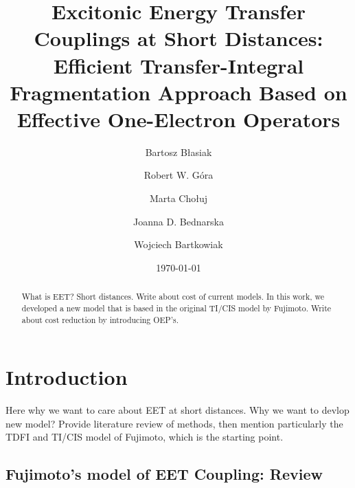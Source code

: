 


\title{Excitonic Energy Transfer Couplings at Short Distances: Efficient Transfer-Integral Fragmentation Approach
Based on Effective One-Electron Operators}

\author{Bartosz B{\l}asiak}
\author{Robert W. G{\'o}ra}
\author{Marta Cho{\l}uj} 
\author{Joanna D. Bednarska}
\author{Wojciech Bartkowiak}


\date{\today}

\begin{abstract}
What is EET? Short distances. Write about cost of current models. In this work, we developed a new model 
that is
based in the original TI/CIS model by Fujimoto. Write about cost reduction by introducing OEP's.
\end{abstract}

\pacs{}

\maketitle

\tableofcontents

\section{\label{s:1}Introduction}

Here why we want to care about EET at short distances. Why we want to devlop new model?
Provide literature review
of methods, then mention particularly the TDFI and TI/CIS model of Fujimoto, which
is the starting point. 

\subsection{\label{s:2.0}Fujimoto's model of EET Coupling: Review}

